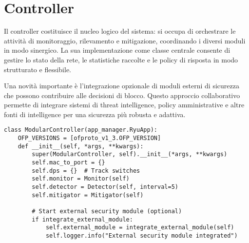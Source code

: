 \section{Controller}
Il controller costituisce il nucleo logico del sistema: si occupa di orchestrare le attività di monitoraggio, rilevamento e mitigazione, coordinando i diversi moduli in modo sinergico. La sua implementazione come classe centrale consente di gestire lo stato della rete, le statistiche raccolte e le policy di risposta in modo strutturato e flessibile.\par
Una novità importante è l'integrazione opzionale di moduli esterni di sicurezza che possono contribuire alle decisioni di blocco. Questo approccio collaborativo permette di integrare sistemi di threat intelligence, policy amministrative e altre fonti di intelligence per una sicurezza più robusta e adattiva.
\begin{verbatim}
class ModularController(app_manager.RyuApp):
    OFP_VERSIONS = [ofproto_v1_3.OFP_VERSION]
    def __init__(self, *args, **kwargs):
        super(ModularController, self).__init__(*args, **kwargs)
        self.mac_to_port = {}
        self.dps = {}  # Track switches
        self.monitor = Monitor(self)
        self.detector = Detector(self, interval=5)
        self.mitigator = Mitigator(self)
        
        # Start external security module (optional)
        if integrate_external_module:
            self.external_module = integrate_external_module(self)
            self.logger.info("External security module integrated")
\end{verbatim}

